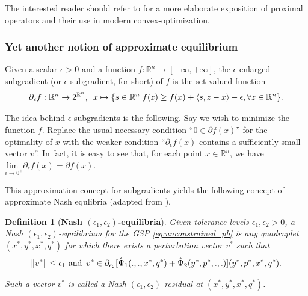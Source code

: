 \documentclass{article} %
\newtheorem{definition}[theorem]{Definition}
\begin{document}
The interested reader should refer to \cite{combettes2011proximal} for
a more elaborate exposition of proximal operators and their
use in modern convex-optimization.

\subsubsection{Yet another notion of approximate equilibrium}
Given a scalar $\epsilon > 0$ and a function $f:\mathbb{R}^n
\rightarrow [-\infty,+\infty]$, the $\epsilon$-enlarged subgradient (or
$\epsilon$-subgradient, for short) of $f$ is the set-valued function
\begin{eqnarray}
\partial_\epsilon f: \mathbb{R}^n \rightarrow
2^{\mathbb{R}^n}, \hspace{.5em} x \mapsto \{s \in \mathbb{R}^n | f(z)
\ge f(x) + \langle s, z - x\rangle - \epsilon,\forall z \in
\mathbb{R}^n\}.
\end{eqnarray}

The idea behind $\epsilon$-subgradients is the following. Say we wish
to minimize the function $f$. Replace the usual necessary
condition ``$0 \in \partial f(x)$'' for the optimality of $x$ with the
weaker condition ``$\partial_\epsilon f(x)$ contains a sufficiently
small vector $v$''. In fact, it is easy to see that, for each
point $x \in \mathbb{R}^n$, we have $\underset{\epsilon \rightarrow
  0^+}{\text{lim }}\partial_\epsilon f(x) = \partial f(x)$.

This approximation concept for subgradients yields the following
concept of approximate Nash equlibria (adapted from
\cite{he2013accelerating}).

\begin{definition}[\textbf{Nash $(\epsilon_1,\epsilon_2)$-equilibria}]
Given tolerance levels $\epsilon_1, \epsilon_2 > 0$, a Nash
$(\epsilon_1,\epsilon_2)$-equilibrium for the GSP \eqref{eq:unconstrained_pb}
is any quadruplet $(x^*, y^*, x^*, q^*)$ for which
there exists a perturbation vector $v^*$ such that
\begin{eqnarray}
\|v^*\| \le \epsilon_1 \text{ and}\hspace{.5em} v^* \in
\partial_{\epsilon_2}[\hat{\Psi}_1(., ., x^*, q^*) +
  \hat{\Psi}_2(y^*, p^*, ., .)](y^*,p^*,x^*,q^*).
\end{eqnarray}

Such a vector $v^*$ is called a Nash $(\epsilon_1, \epsilon_2)$-residual at $(x^*,
y^*, x^*, q^*)$.
\label{thm:cool_notion}
\end{definition}
\end{document}
